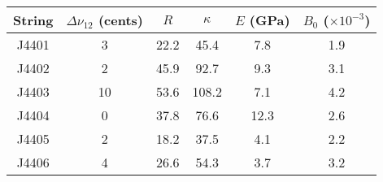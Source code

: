 \begin{tabular}{cccccc}
\toprule
String &  $\Delta \nu_{12}$ (cents) &  $R$ &  $\kappa$ &  $E$ (GPa) &  $B_0$ ($\times 10^{-3}$) \\
\midrule
 J4401 &                          3 & 22.2 &      45.4 &        7.8 &                       1.9 \\
 J4402 &                          2 & 45.9 &      92.7 &        9.3 &                       3.1 \\
 J4403 &                         10 & 53.6 &     108.2 &        7.1 &                       4.2 \\
 J4404 &                          0 & 37.8 &      76.6 &       12.3 &                       2.6 \\
 J4405 &                          2 & 18.2 &      37.5 &        4.1 &                       2.2 \\
 J4406 &                          4 & 26.6 &      54.3 &        3.7 &                       3.2 \\
\bottomrule
\end{tabular}

